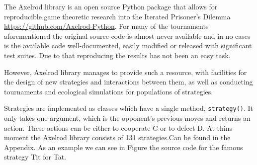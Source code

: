The Axelrod library \cite{axelrodproject} is an open source Python package that allows for
reproducible game theoretic research into the Iterated Prisoner's Dilemma
\url{https://github.com/Axelrod-Python}.
For many of the tournaments aforementioned the original source code is almost never
available and in no cases is the available code well-documented, easily modified
or released with significant test suites. Due to that reproducing the results
has not been an easy task.

However, Axelrod library manages to provide such a resource, with facilities for
the design of new strategies and interactions between them, as well as
conducting tournaments and ecological simulations for populations of strategies.

Strategies are implemented as classes which have a single method, \texttt{strategy()}.
It only takes one argument, which is the opponent's previous moves and returns
an action. These actions can be either to cooperate C or to defect D. At thins
moment the Axelrod library consists of 131 strategies.Can be found in the Appendix.
As an example we can see in Figure  the source code for the
famous strategy Tit for Tat.


